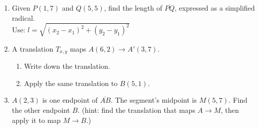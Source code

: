 \begin{enumerate}
\item Given $P(1,7)$ and $Q(5,5)$, find the length of $\overline{PQ}$, expressed as a simplified radical.\\[0.25cm]
Use: $l=\sqrt{(x_2-x_1)^2+(y_2-y_1)^2}$
    \vspace{4cm}

\item A translation $T_{x,y}$ maps $A(6,2) \rightarrow A'(3,7)$. 
\begin{enumerate}
  \item Write down the translation. \vspace{1cm}
  \item Apply the same translation to $B(5, 1)$.
\end{enumerate} \vspace{2cm}

\item $A(2,3)$ is one endpoint of $\overline{AB}$. The segment's midpoint is $M(5,7)$. Find the other endpoint $B$. (hint: find the translation that maps $A \rightarrow M$, then apply it to map $M \rightarrow B$.)

\end{enumerate}

  